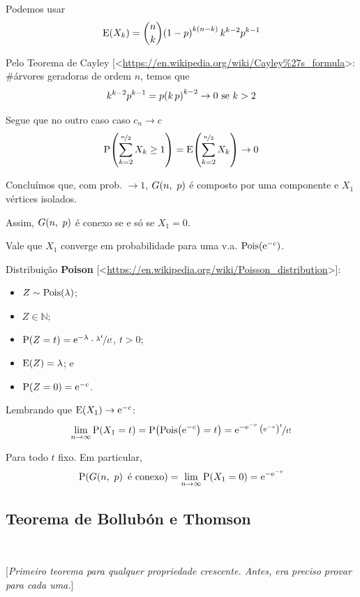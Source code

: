 {Podemos usar
\vspace*{-\baselineskip}
\[
  \E\l(X_k\r) = \binom{n}{k} \l(1-p\r)^{k\l(n-k\r)} k^{k-2} p^{k-1}
\]

Pelo Teorema de Cayley [<\href{https://en.wikipedia.org/wiki/Cayley%27s_formula}{https://en.wikipedia.org/wiki/Cayley\%27s\_formula}>: \#árvores geradoras de ordem $n$, temos que
\[
  k^{k-2} p^{k-1} = p\l(k\,p\r)^{k-2} \rightarrow 0 \text{ se } k>2
\]

Segue que no outro caso caso $c_n\rightarrow c$
\[
  \P\l(\sum_{k=2}^{\nf{n}{2}} X_k \geq 1\r) = \E\l(\sum_{k=2}^{\nf{n}{2}} X_k\r) \rightarrow 0
\]

Concluímos que, com prob. $\rightarrow1$, $G\l(n,\ p\r)$ é composto por uma componente e $X_1$ vértices isolados.

Assim, $G\l(n,\ p\r)$ é conexo se e só se $X_1=0$.

Vale que $X_1$ converge em probabilidade para uma v.a. $\mathrm{Pois}\l(\e^{-c}\r)$.

Distribuição \textbf{Poison} [<\href{https://en.wikipedia.org/wiki/Poisson_distribution}{https://en.wikipedia.org/wiki/Poisson\_distribution}>]:
\begin{itemize}
  \item $Z\sim\mathrm{Pois}\l(\lambda\r)$;
  \item $Z\in\mathbb{N}$;
  \item $\P\l(Z=t\r) = \e^{-\lambda}\d\nf{\lambda^t}{t!}$, $t>0$;
  \item $\E\l(Z\r) = \lambda$; e 
  \item $\P\l(Z=0\r) = \e^{-c}$.
\end{itemize}

Lembrando que $\E\l(X_1\r)\rightarrow\e^{-c}$:
\[
  \lim_{n\rightarrow\infty} \P\l(X_1=t\r)
    = \P\l(\mathrm{Pois}\l(\e^{-c}\r)=t\r)
    = \e^{-\e^{-c}}\,\nf{\l(\e^{-c}\r)^t}{t!}
\]

Para todo $t$ fixo. Em particular,
\[
  \P\l(G\l(n,\ p\r) \text{ é conexo}\r) = \lim_{n\rightarrow\infty} \P\l(X_1=0\r)=\e^{-\e^{-c}}
\]

\clearpage
\subsection{Teorema de Bollubón e Thomson}$ $\newline

[\textit{Primeiro teorema para qualquer propriedade crescente. Antes, era preciso provar para cada uma.}]

}
